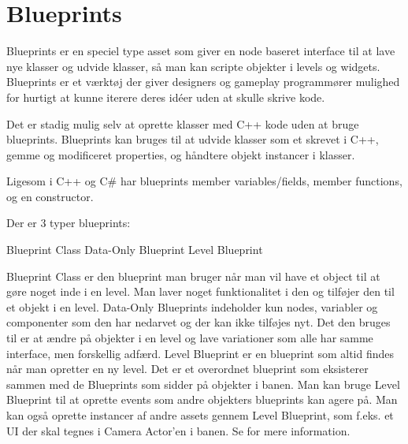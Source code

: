
\section{Blueprints}
Blueprints er en speciel type asset som giver en node baseret interface til at lave nye klasser og udvide klasser, så man kan scripte objekter i levels og widgets. Blueprints er et værktøj der giver designers og gameplay programmører mulighed for hurtigt at kunne iterere deres idéer uden at skulle skrive kode.

Det er stadig mulig selv at oprette klasser med C++ kode uden at bruge blueprints. Blueprints kan bruges til at udvide klasser som et skrevet i C++, gemme og modificeret properties, og håndtere objekt instancer i klasser.

Ligesom i C++ og C# har blueprints member variables/fields, member functions, og en constructor.

Der er 3 typer blueprints:

Blueprint Class
Data-Only Blueprint
Level Blueprint

Blueprint Class er den blueprint man bruger når man vil have et object til at gøre noget inde i en level. Man laver noget funktionalitet i den og tilføjer den til et objekt i en level. Data-Only Blueprints indeholder kun nodes, variabler og componenter som den har nedarvet og der kan ikke tilføjes nyt. Det den bruges til er at ændre på objekter i en level og lave variationer som alle har samme interface, men forskellig adfærd. Level Blueprint er en blueprint som altid findes når man opretter en ny level. Det er et overordnet blueprint som eksisterer sammen med de Blueprints som sidder på objekter i banen. Man kan bruge Level Blueprint til at oprette events som andre objekters blueprints kan agere på. Man kan også oprette instancer af andre assets gennem Level Blueprint, som f.eks. et UI der skal tegnes i Camera Actor'en i banen. Se \cite{blueprint} for mere information.
